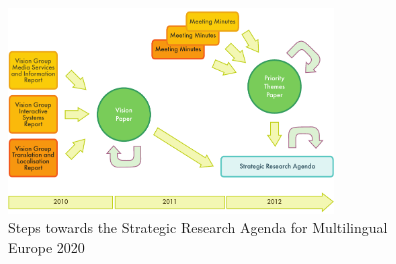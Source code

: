 \documentclass[10pt, plain]{../../metanetpaper}
\begin{document}
\begin{figure}[htb]
  \center
  \includegraphics[width=0.77\textwidth]{../_media/Towards-SRA}
  \caption{Steps towards the Strategic Research Agenda for Multilingual Europe 2020}
  \label{fig:towards-sra}
\end{figure}

\clearpage


\label{sec:app-meta-net}

%
%
\end{document}
